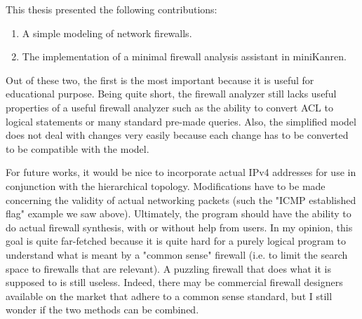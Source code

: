 \else
This thesis presented the following contributions:
\begin{enumerate}
\item A simple modeling of network firewalls.
\item The implementation of a minimal firewall analysis assistant in miniKanren.
\end{enumerate}

Out of these two, the first is the most important because it is useful for educational purpose. Being quite short, the firewall analyzer still lacks useful properties of a useful firewall analyzer such as the ability to convert ACL to logical statements or many standard pre-made queries. Also, the simplified model does not deal with changes very easily because each change has to be converted to be compatible with the model.

For future works, it would be nice to incorporate actual IPv4 addresses for use in conjunction with the hierarchical topology. Modifications have to be made concerning the validity of actual networking packets (such the "ICMP established flag" example we saw above). Ultimately, the program should have the ability to do actual firewall synthesis, with or without help from users. In my opinion, this goal is quite far-fetched because it is quite hard for a purely logical program to understand what is meant by a "common sense" firewall (i.e. to limit the search space to firewalls that are relevant). A puzzling firewall that does what it is supposed to is still useless. Indeed, there may be commercial firewall designers available on the market that adhere to a common sense standard, but I still wonder if the two methods can be combined.
\fi